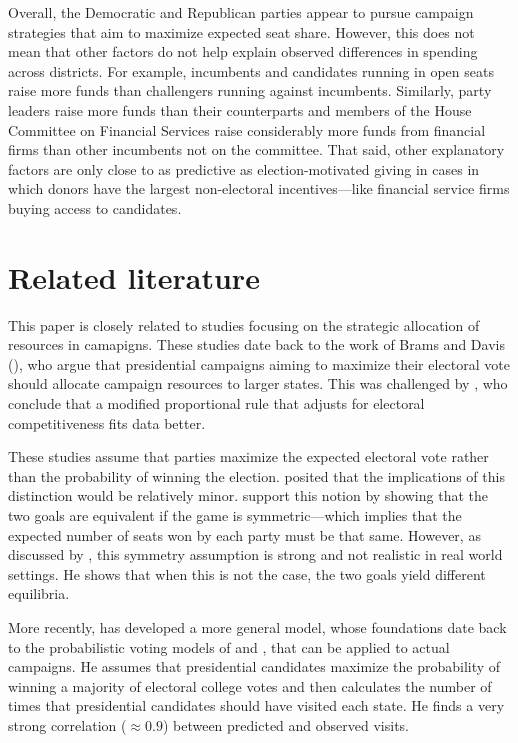 \documentclass[12pt,final,fleqn]{article}
\theoremstyle{plain}
\begin{document}
Overall, the Democratic and Republican parties appear to pursue campaign strategies that aim to maximize expected seat share. However, this does not mean that other factors do not help explain observed differences in spending across districts. For example, incumbents and candidates running in open seats raise more funds than challengers running against incumbents. Similarly, party leaders raise more funds than their counterparts and members of the House Committee on Financial Services raise considerably more funds from financial firms than other incumbents not on the committee. That said, other explanatory factors are only close to as predictive as election-motivated giving in cases in which donors have the largest non-electoral incentives---like financial service firms buying access to candidates.

\section{Related literature}

This paper is closely related to studies focusing on the strategic allocation of resources in camapigns. These studies date back to the work of Brams and Davis (\citeyear{brams1973resource, brams19743}), who argue that presidential campaigns aiming to maximize their electoral vote should allocate campaign resources to larger states. This was challenged by \citet{colantoni1975campaign}, who conclude that a modified proportional rule that adjusts for electoral competitiveness fits data better.

These studies assume that parties maximize the expected electoral vote rather than the probability of winning the election. \citet{brams1973resource} posited that the implications of this distinction would be relatively minor. \citet{aranson1974election} support this notion by showing that the two goals are equivalent if the game is symmetric---which implies that the expected number of seats won by each party must be that same. However, as discussed by \citet{snyder1989election}, this symmetry assumption is strong and not realistic in real world settings. He shows that when this is not the case, the two goals yield different equilibria.

More recently, \citet{stromberg2008electoral} has developed a more general model, whose foundations date back to the probabilistic voting models of\citet{lindbeck1987balanced} and \citet{dixit1996determinants}, that can be applied to actual campaigns. He assumes that presidential candidates maximize the probability of winning a majority of electoral college votes and then calculates the number of times that presidential candidates should have visited each state. He finds a very strong  correlation ($ \approx 0.9$) between predicted and observed visits. 
\end{document}
